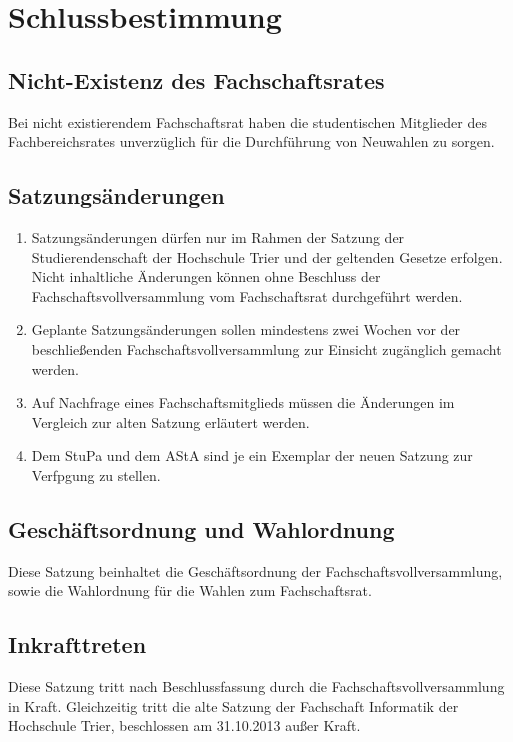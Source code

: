 \section{Schlussbestimmung}
\subsection{Nicht-Existenz des Fachschaftsrates}
Bei nicht existierendem Fachschaftsrat haben die studentischen Mitglieder des Fachbereichsrates unverzüglich für die Durchführung von Neuwahlen zu sorgen.

\subsection{Satzungsänderungen}
\begin{enumerate}
\item Satzungsänderungen dürfen nur im Rahmen der Satzung der Studierendenschaft der Hochschule Trier und der geltenden Gesetze erfolgen. Nicht inhaltliche Änderungen können ohne Beschluss der Fachschaftsvollversammlung vom Fachschaftsrat durchgeführt werden.
\item Geplante Satzungsänderungen sollen mindestens zwei Wochen vor der beschließenden Fachschaftsvollversammlung zur Einsicht zugänglich gemacht werden.
\item Auf Nachfrage eines Fachschaftsmitglieds müssen die Änderungen im Vergleich zur alten Satzung erläutert werden.
\item Dem StuPa und dem AStA sind je ein Exemplar der neuen Satzung zur Verfpgung zu stellen.
\end{enumerate}

\subsection{Geschäftsordnung und Wahlordnung}
Diese Satzung beinhaltet die Geschäftsordnung der Fachschaftsvollversammlung, sowie die Wahlordnung für die Wahlen zum Fachschaftsrat.

\subsection{Inkrafttreten}
Diese Satzung tritt nach Beschlussfassung durch die Fachschaftsvollversammlung in Kraft. Gleichzeitig tritt die alte Satzung der Fachschaft Informatik der Hochschule Trier, beschlossen am 31.10.2013 außer Kraft.
